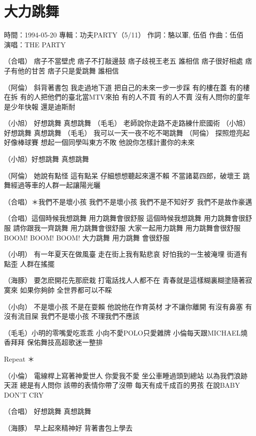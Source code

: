 \documentclass[UTF8,a4paper,oneside,twocolumn,12pt]{ctexbook}
\newcommand{\infopair}[2]{\textbullet #1：#2}
\newcommand{\zc}[1][伍佰]{\infopair{作詞}{#1}}
\newcommand{\zq}[1][伍佰]{\infopair{作曲}{#1}}
\newcommand{\zj}[1]{\infopair{專輯}{#1}}
\newcommand{\sj}[1]{\infopair{時間}{#1}}
\newenvironment{info}{\begin{flushleft}\kaishu
	}
	{\end{flushleft}\normalsize\yahei\par}
\newenvironment{lyric}{
	}
{}
\begin{document}
\section{大力跳舞}
\begin{info}
	\sj{1994-05-20}
	\zj{功夫PARTY（5/11）}
	\zc[駱以軍, 伍佰]
	\zq
	\infopair{演唱}{THE PARTY}
\end{info}
\begin{lyric}
	（合唱）
	痞子不當壁虎 痞子不打敲邊鼓
	痞子歧視王老五 誰相信
	痞子很好相處 痞子有他的甘苦
	痞子只是愛跳舞 誰相信

	（阿倫）
	斜背著書包 我走過地下道 把自己的未來一步一步踩
	有的樓在蓋 有的樓在拆 有的人把他們的臺北當MTV來拍
	有的人不買 有的人不賣 沒有人問你的童年是少年快報
	還是迪斯耐

	（小旭） 好想跳舞 真想跳舞
	（毛毛） 老師說你走路不走路練什麽國術
	（小旭） 好想跳舞 真想跳舞
	（毛毛） 我可以一天一夜不吃不喝跳舞
	（阿倫） 探照燈亮起 好像棒球賽 想起一個同學叫東方不敗
	他說你怎樣計畫你的未來

	（小旭）好想跳舞 真想跳舞

	（阿倫）
	她說有點怪 這有點呆
	仔細想想聽起來還不賴
	不當諸葛四郎，破壞王
	跳舞經過等車的人群一起讓陽光曬

	（合唱）＊我們不是壞小孩 我們不是壞小孩
	我們不是不知好歹 我們不是故作豪邁

	（合唱）這個時候我想跳舞 用力跳舞會很舒服
	這個時候我想跳舞 用力跳舞會很舒服
	請你跟我一齊跳舞 用力跳舞會很舒服
	大家一起用力跳舞 用力跳舞會很舒服
	BOOM! BOOM! BOOM! 大力跳舞
	用力跳舞 會很舒服

	（小明）
	有一年夏天在做風臺 走在街上我有點悲哀
	好怕我的一生被淹埋 街道有點歪 人群在搖擺

	（海豚）
	要怎麽開花先那麽栽 打電話找人人都不在
	青春就是這樣糊裏糊塗隨著寂寞來 如果你夠帥
	全世界都可以不睬

	（小向）
	不是壞小孩 不是在耍賴 他說他在作育英材
	才不讓你離開
	有沒有鼻塞 有沒有流目屎 我們不是壞小孩
	不理我們不應該

	（毛毛）小明的零嘴愛吃乖乖 小向不愛POLO只愛雜牌
	小倫每天跟MICHAEL燒香拜拜
	保佑舞技高超歌迷一整排

	Repeat ＊

	（小倫）
	電線桿上寫著神愛世人 你愛我不愛
	坐公車睡過頭到總站 以為我們浪跡天涯
	總是有人問你 該帶的表情你帶了沒帶
	每天有成千成百的男孩 在說BABY DON'T CRY

	（合唱） 好想跳舞 真想跳舞

	（海豚）
	早上起來精神好 背著書包上學去
\end{lyric}
\end{document}
